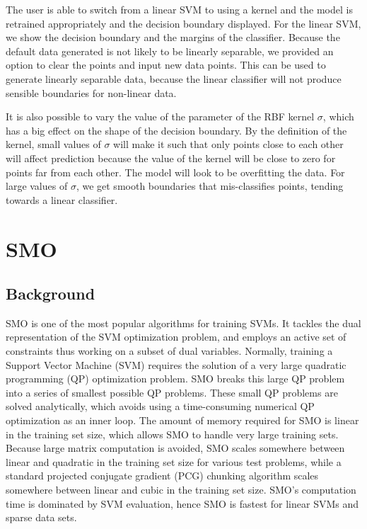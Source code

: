 \documentclass[11pt,letterpaper]{article}
\begin{document}
The user is able to switch from a linear SVM to using a kernel and the model is retrained appropriately and the decision boundary displayed. For the linear SVM, we show the decision boundary and the margins of the classifier. Because the default data generated is not likely to be linearly separable, we provided an option to clear the points and input new data points. This can be used to generate linearly separable data, because the linear classifier will not produce sensible boundaries for non-linear data.

It is also possible to vary the value of the parameter of the RBF kernel $\sigma$, which has a big effect on the shape of the decision boundary. By the definition of the kernel, small values of $\sigma$ will make it such that only points close to each other will affect prediction because the value of the kernel will be close to zero for points far from each other. The model will look to be overfitting the data. For large values of $\sigma$, we get smooth boundaries that mis-classifies points, tending towards a linear classifier.

\section{SMO}

\subsection{Background}

SMO is one of the most popular algorithms for training SVMs. It tackles the dual representation of the SVM optimization problem, and employs an active set of constraints thus working on a subset of dual variables. Normally, training a Support Vector Machine (SVM) requires the solution of a very large quadratic programming (QP) optimization problem. SMO breaks this large QP problem into a series of smallest possible QP problems. These small QP problems are solved analytically, which avoids using a time-consuming numerical QP optimization as an inner loop. The amount of memory required for SMO is linear in the training set size, which allows SMO to handle very large training sets. Because large matrix computation is avoided, SMO scales somewhere between linear and quadratic in the training set size for various test problems, while a standard projected conjugate gradient (PCG) chunking algorithm scales somewhere between linear and cubic in the training set size. SMO's computation time is dominated by SVM evaluation, hence SMO is fastest for linear SVMs and sparse data sets.
\end{document}
